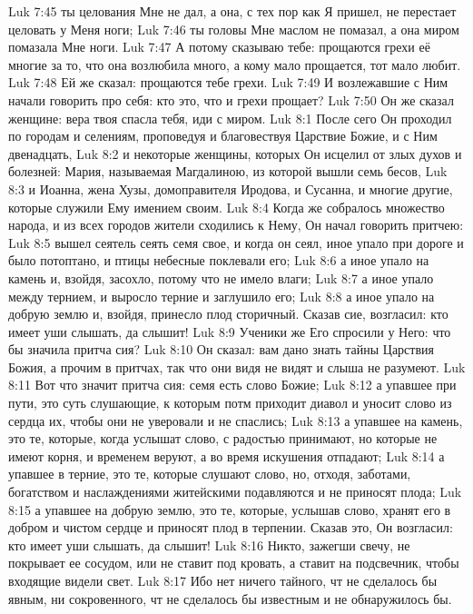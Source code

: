 \vs Luk 7:45 ты целования Мне не дал, а она, с тех пор как Я пришел, не перестает целовать у Меня ноги;
\vs Luk 7:46 ты головы Мне маслом не помазал, а она миром помазала Мне ноги.
\vs Luk 7:47 А потому сказываю тебе: прощаются грехи её многие за то, что она возлюбила много, а кому мало прощается, тот мало любит.
\vs Luk 7:48 Ей же сказал: прощаются тебе грехи.
\vs Luk 7:49 И возлежавшие с Ним начали говорить про себя: кто это, что и грехи прощает?
\vs Luk 7:50 Он же сказал женщине: вера твоя спасла тебя, иди с миром.
\vs Luk 8:1 После сего Он проходил по городам и селениям, проповедуя и благовествуя Царствие Божие, и с Ним двенадцать,
\vs Luk 8:2 и некоторые женщины, которых Он исцелил от злых духов и болезней: Мария, называемая Магдалиною, из которой вышли семь бесов,
\vs Luk 8:3 и Иоанна, жена Хузы, домоправителя Иродова, и Сусанна, и многие другие, которые служили Ему имением своим.
\rsbpar\vs Luk 8:4 Когда же собралось множество народа, и из всех городов жители сходились к Нему, Он начал говорить притчею:
\vs Luk 8:5 вышел сеятель сеять семя свое, и когда он сеял, иное упало при дороге и было потоптано, и птицы небесные поклевали его;
\vs Luk 8:6 а иное упало на камень и, взойдя, засохло, потому что не имело влаги;
\vs Luk 8:7 а иное упало между тернием, и выросло терние и заглушило его;
\vs Luk 8:8 а иное упало на добрую землю и, взойдя, принесло плод сторичный. Сказав сие, возгласил: кто имеет уши слышать, да слышит!
\vs Luk 8:9 Ученики же Его спросили у Него: что бы значила притча сия?
\vs Luk 8:10 Он сказал: вам дано знать тайны Царствия Божия, а прочим в притчах, так что они видя не видят и слыша не разумеют.
\vs Luk 8:11 Вот что значит притча сия: семя есть слово Божие;
\vs Luk 8:12 а упавшее при пути, это суть слушающие, к которым потм приходит диавол и уносит слово из сердца их, чтобы они не уверовали и не спаслись;
\vs Luk 8:13 а упавшее на камень, это те, которые, когда услышат слово, с радостью принимают, но которые не имеют корня, и временем веруют, а во время искушения отпадают;
\vs Luk 8:14 а упавшее в терние, это те, которые слушают слово, но, отходя, заботами, богатством и наслаждениями житейскими подавляются и не приносят плода;
\vs Luk 8:15 а упавшее на добрую землю, это те, которые, услышав слово, хранят его в добром и чистом сердце и приносят плод в терпении. Сказав это, Он возгласил: кто имеет уши слышать, да слышит!
\vs Luk 8:16 Никто, зажегши свечу, не покрывает ее сосудом, или не ставит под кровать, а ставит на подсвечник, чтобы входящие видели свет.
\vs Luk 8:17 Ибо нет ничего тайного, чт не сделалось бы явным, ни сокровенного, чт не сделалось бы известным и не обнаружилось бы.
